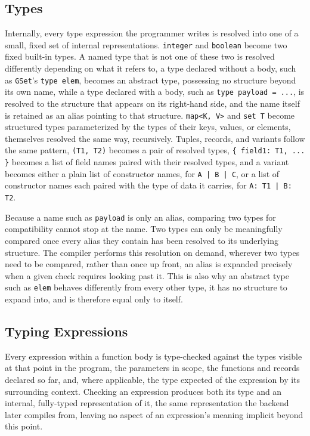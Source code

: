 \subsection{Types}
\label{sub:types}

Internally, every type expression the programmer writes is resolved into one of a small, fixed set of internal
representations. \texttt{integer} and \texttt{boolean} become two fixed built-in types. A named type that is not one of
these two is resolved differently depending on what it refers to, a type declared without a body, such as \texttt{GSet}'s
\texttt{type elem}, becomes an abstract type, possessing no structure beyond its own name, while a type declared with a
body, such as \texttt{type payload = ...}, is resolved to the structure that appears on its right-hand side, and the name
itself is retained as an alias pointing to that structure. \texttt{map<K, V>} and \texttt{set T} become structured types
parameterized by the types of their keys, values, or elements, themselves resolved the same way, recursively. Tuples,
records, and variants follow the same pattern, \texttt{(T1, T2)} becomes a pair of resolved types,
\texttt{\{ field1: T1, ... \}} becomes a list of field names paired with their resolved types, and a variant becomes
either a plain list of constructor names, for \texttt{A | B | C}, or a list of constructor names each paired with the
type of data it carries, for \texttt{A: T1 | B: T2}.

Because a name such as \texttt{payload} is only an alias, comparing two types for compatibility cannot stop at the name. Two
types can only be meaningfully compared once every alias they contain has been resolved to its underlying structure. The
compiler performs this resolution on demand, wherever two types need to be compared, rather than once up front, an alias
is expanded precisely when a given check requires looking past it. This is also why an abstract type such as \texttt{elem}
behaves differently from every other type, it has no structure to expand into, and is therefore equal only to itself.

\subsection{Typing Expressions}
\label{sub:typing-expressions}

Every expression within a function body is type-checked against the types visible at that point in the program, the
parameters in scope, the functions and records declared so far, and, where applicable, the type expected of the expression
by its surrounding context. Checking an expression produces both its type and an internal, fully-typed representation of
it, the same representation the backend later compiles from, leaving no aspect of an expression's meaning implicit beyond
this point.

